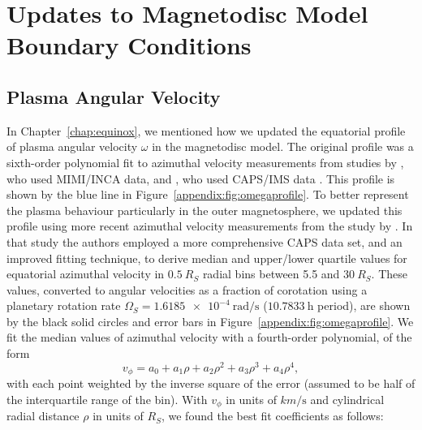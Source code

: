 \appendix
\chapter{Updates to Magnetodisc Model Boundary Conditions} \label{appendix:sec:wilsonfits}
\section{Plasma Angular Velocity}\label{appendix:sec:plasmaomega}
In Chapter~\ref{chap:equinox}, we mentioned how we updated the equatorial profile of plasma angular velocity $\omega$ in the magnetodisc model. The original profile was a sixth-order polynomial fit to azimuthal velocity measurements from studies by \citet{kane2008}, who used MIMI/INCA data, and \citet{wilson2008}, who used CAPS/IMS data \citep[more detail in][]{achilleos2010a}. This profile is shown by the blue line in Figure~\ref{appendix:fig:omegaprofile}. To better represent the plasma behaviour particularly in the outer magnetosphere, we updated this profile using more recent azimuthal velocity measurements from the study by \citet{wilson2017}. In that study the authors employed a more comprehensive CAPS data set, and an improved fitting technique, to derive median and upper/lower quartile values for equatorial azimuthal velocity in $\SI{0.5}{R_S}$ radial bins between 5.5 and $\SI{30}{R_S}$. These values, converted to angular velocities as a fraction of corotation using a planetary rotation rate $\Omega_S = \SI{1.6185e-4}{\radian\per\second}$ ($\SI{10.7833}{\hour}$ period), are shown by the black solid circles and error bars in Figure~\ref{appendix:fig:omegaprofile}. We fit the median values of azimuthal velocity with a fourth-order polynomial, of the form 
\begin{equation} \label{appendix:eq:fourthorderpolyv}
v_\phi =  a_0 + a_1\rho + a_2\rho^2 + a_3\rho^3 + a_4\rho^4,
\end{equation}
with each point weighted by the inverse square of the error (assumed to be half of the interquartile range of the bin). With $v_\phi$ in units of $\si{km\per\second}$ and cylindrical radial distance $\rho$ in units of $\si{R_S}$, we found the best fit coefficients as follows:

